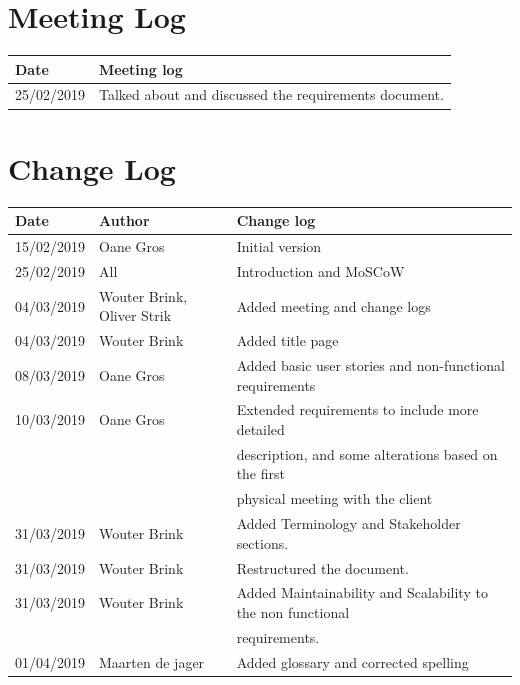 \documentclass{article}
\begin{document}
\printglossary

\section{Meeting Log}
\begin{center}
 \begin{tabular}{ | l | l | }
  \hline
  \bf{Date} & \bf{Meeting log} \\
  \hline
  25/02/2019 & Talked about and discussed the requirements document. \\
  \hline
 \end{tabular}
\end{center}

\newpage
\section{Change Log}
\begin{center}
 \begin{tabular}{ | l | l | l | }
  \hline
  \bf{Date} & \bf{Author} & \bf{Change log} \\
  \hline
  15/02/2019 & Oane Gros & Initial version \\
  \hline
  25/02/2019 & All & Introduction and MoSCoW \\
  \hline
  04/03/2019 & Wouter Brink, Oliver Strik & Added meeting and change logs\\
  \hline
  04/03/2019 & Wouter Brink & Added title page \\
  \hline
  08/03/2019 & Oane Gros & Added basic user stories and non-functional requirements \\
  \hline
  10/03/2019 & Oane Gros & Extended requirements to include more detailed \\  & & description,
   and some alterations based on the first \\ & & physical meeting with the client \\
  \hline
  31/03/2019 & Wouter Brink & Added Terminology and Stakeholder sections. \\
  \hline
  31/03/2019 & Wouter Brink & Restructured the document. \\
  \hline
  31/03/2019 & Wouter Brink & Added Maintainability and Scalability to the non functional \\
  & & requirements. \\
  \hline
  01/04/2019 & Maarten de jager & Added glossary and corrected spelling \\
  \hline
 \end{tabular}
\end{center}
\end{document}
